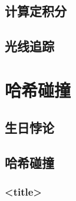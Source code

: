 \documentclass{beamer}
\begin{document}
\subsection{计算定积分}

\subsection{光线追踪}

\section{哈希碰撞}

\subsection{生日悖论}

\subsection{哈希碰撞}

\begin{frame}
    \frametitle{<title>}

    

\end{frame}
\end{document}
